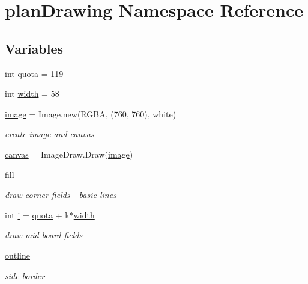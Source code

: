 \hypertarget{namespaceplan_drawing}{}\section{plan\+Drawing Namespace Reference}
\label{namespaceplan_drawing}
\subsection*{Variables}
\begin{DoxyCompactItemize}
\item 
int \mbox{\hyperlink{namespaceplan_drawing_a24a9f6fc7a9b6b3d6f1d1b8e0dd33e5d}{quota}} = 119
\item 
int \mbox{\hyperlink{namespaceplan_drawing_a514306bc74067f7281091ab310589e78}{width}} = 58
\item 
\mbox{\hyperlink{namespaceplan_drawing_af4e3df3fcff8b46fd59536de55f1a4c9}{image}} = Image.\+new(\textquotesingle{}R\+G\+BA\textquotesingle{}, (760, 760), \textquotesingle{}white\textquotesingle{})
\begin{DoxyCompactList}\small\item\em create image and canvas \end{DoxyCompactList}\item 
\mbox{\hyperlink{namespaceplan_drawing_a139a52c2f0375bb4e8072d73c20041e3}{canvas}} = Image\+Draw.\+Draw(\mbox{\hyperlink{namespaceplan_drawing_af4e3df3fcff8b46fd59536de55f1a4c9}{image}})
\item 
\mbox{\hyperlink{namespaceplan_drawing_a19c8949ae2db8517ca8e83961816549d}{fill}}
\begin{DoxyCompactList}\small\item\em draw corner fields -\/ basic lines \end{DoxyCompactList}\item 
int \mbox{\hyperlink{namespaceplan_drawing_a9b507814fb99be9c876ea329f40fc0f1}{i}} = \mbox{\hyperlink{namespaceplan_drawing_a24a9f6fc7a9b6b3d6f1d1b8e0dd33e5d}{quota}} + k$\ast$\mbox{\hyperlink{namespaceplan_drawing_a514306bc74067f7281091ab310589e78}{width}}
\begin{DoxyCompactList}\small\item\em draw mid-\/board fields \end{DoxyCompactList}\item 
\mbox{\hyperlink{namespaceplan_drawing_a427e8900e35f26469209eec6cca37289}{outline}}
\begin{DoxyCompactList}\small\item\em side border \end{DoxyCompactList}\item 

\end{DoxyCompactItemize}
